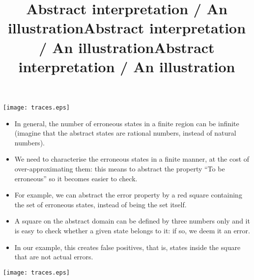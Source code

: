 \documentclass[wide]{slides}
\begin{document}
\begin{slide}
  \title{Abstract interpretation / An illustration}

  \begin{center}
    \texttt{[image: traces.eps]}
  \end{center}

\end{slide}

\begin{slide}
  \title{Abstract interpretation / An illustration}

  \begin{itemize}

    \item In general, the number of erroneous states in a finite
      region can be infinite (imagine that the abstract states are
      rational numbers, instead of natural numbers).

    \item We need to characterise the erroneous states in a finite
      manner, at the cost of over\hyp{}approximating them: this means
      to abstract the property ``To be erroneous'' so it becomes
      easier to check.

    \item For example, we can abstract the error property by a red
      square containing the set of erroneous states, instead of being
      the set itself.

    \item A square on the abstract domain can be defined by three
      numbers only and it is easy to check whether a given state
      belongs to it: if so, we deem it an error.

    \item In our example, this creates false positives, that is,
      states inside the square that are not actual errors.

  \end{itemize}

\end{slide}

\begin{slide}
  \title{Abstract interpretation / An illustration}

  \begin{center}
    \texttt{[image: traces.eps]}
  \end{center}

\end{slide}
\end{document}
